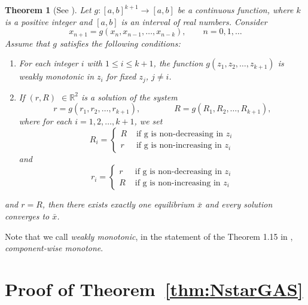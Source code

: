 \documentclass{article}
\newtheorem{theorem}{Theorem}
\numberwithin{theorem}{section}
\begin{document}
{\begin{theorem}[See ]\label{ThmLadas}
Let $g:[a,b]^{k+1} \to [a,b]$ be a continuous function, where $k$ is a positive integer and $[a,b]$ is an interval of real numbers. Consider 
$$x_{n+1} = g(x_n,x_{n-1},\ldots, x_{n-k}),\quad \quad n=0,1,\ldots$$
Assume that $g$ satisfies the following conditions: 
\begin{enumerate}
    \item For each integer $i$ with $1\leq i\leq k+1$, the function $g(z_1,z_2,\ldots, z_{k+1})$ is weakly monotonic in $z_i$ for fixed $z_j$, $j\neq i$.
    \item If $(r,R)$ $\in \mathbb{R}^2$ is a solution of the system
$$    r=g(r_1,r_2,\ldots, r_{k+1}), \qquad \qquad 
    R=g(R_1,R_2,\ldots, R_{k+1}),$$
   where for each $i=1,2,\ldots, k+1$, we set
    $$R_i = \begin{cases} R & \mbox{ if g is non-decreasing in }z_i\\
    r & \mbox{ if g is non-increasing in }z_i\end{cases}$$
    and 
    $$r_i = \begin{cases} r & \mbox{ if g is non-decreasing in }z_i\\
    R & \mbox{ if g is non-increasing in }z_i\end{cases}$$
\end{enumerate}
and $r=R$, then there exists exactly one equilibrium $\bar{x}$ and every solution converges to $\bar{x}$.
\end{theorem}

Note that we call {\it weakly monotonic}, in the statement of the Theorem 1.15 in \cite{Ladas_2004}, {\it component-wise monotone}. 


\section{Proof of Theorem~\ref{thm:NstarGAS}}\label{A:NstarGAS}

}
\end{document}
